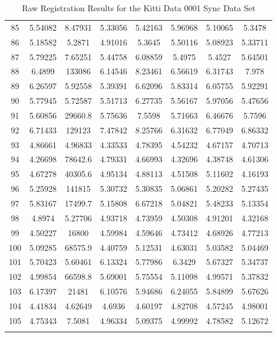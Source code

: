 \begin{center}
\begin{longtable}{cccccccc}
85 & 5.54082 & 8.47931 & 5.33056 & 5.42163 & 5.96968 & 5.10065 & 5.3478\\
86 & 5.18582 & 5.2871 & 4.91016 & 5.3645 & 5.50116 & 5.08923 & 5.33711\\
87 & 5.79225 & 7.65251 & 5.44758 & 6.08859 & 5.4975 & 5.4527 & 5.64501\\
88 & 6.4899 & 133086 & 6.14546 & 8.23461 & 6.56619 & 6.31743 & 7.978\\
89 & 6.26597 & 5.92558 & 5.39391 & 6.62096 & 5.83314 & 6.05755 & 5.92291\\
90 & 5.77945 & 5.72587 & 5.51713 & 6.27735 & 5.56167 & 5.97056 & 5.47656\\
91 & 5.60856 & 29660.8 & 5.75636 & 7.5598 & 5.71663 & 6.46676 & 5.7596\\
92 & 6.71433 & 129123 & 7.47842 & 8.25766 & 6.31632 & 6.77049 & 6.86332\\
93 & 4.86661 & 4.96833 & 4.33533 & 4.78395 & 4.54232 & 4.67157 & 4.70713\\
94 & 4.26698 & 78642.6 & 4.79331 & 4.66993 & 4.32696 & 4.38748 & 4.61306\\
95 & 4.67278 & 40305.6 & 4.95134 & 4.88113 & 4.51508 & 5.11602 & 4.16193\\
96 & 5.25928 & 141815 & 5.30732 & 5.30835 & 5.06861 & 5.20282 & 5.27435\\
97 & 5.83167 & 17499.7 & 5.15808 & 6.67218 & 5.04821 & 5.48233 & 5.13354\\
98 & 4.8974 & 5.27706 & 4.93718 & 4.73959 & 4.50308 & 4.91201 & 4.32168\\
99 & 4.50227 & 16800 & 4.59984 & 4.59646 & 4.73412 & 4.68926 & 4.77213\\
100 & 5.09285 & 68575.9 & 4.40759 & 5.12531 & 4.63031 & 5.03582 & 5.04469\\
101 & 5.70423 & 5.60461 & 6.13324 & 5.77986 & 6.3429 & 5.67327 & 5.34737\\
102 & 4.99854 & 66598.8 & 5.69001 & 5.75554 & 5.11098 & 4.99571 & 5.37832\\
103 & 6.17397 & 21481 & 6.10576 & 5.94686 & 6.24055 & 5.84899 & 5.67626\\
104 & 4.41834 & 4.62649 & 4.6936 & 4.60197 & 4.82708 & 4.57245 & 4.98001\\
105 & 4.75343 & 7.5081 & 4.96334 & 5.09375 & 4.99992 & 4.78582 & 5.12672\\
\caption{Raw Registration Results for the Kitti Data 0001 Sync Data Set}
\label{tab:kittidata0001syncFULL}
\end{longtable}
\end{center}

